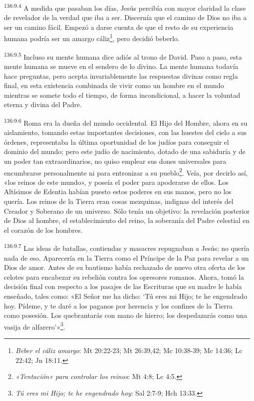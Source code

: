 \par
\textsuperscript{136:9.4} A medida que pasaban los días, Jesús percibía con mayor claridad la clase de revelador de la verdad que iba a ser. Discernía que el camino de Dios no iba a ser un camino fácil. Empezó a darse cuenta de que el resto de su experiencia humana podría ser un amargo cáliz\footnote{\textit{Beber el cáliz amargo}: Mt 20:22-23; Mt 26:39,42; Mc 10:38-39; Mc 14:36; Lc 22:42; Jn 18:11.}, pero decidió beberlo.

\par
\textsuperscript{136:9.5} Incluso su mente humana dice adiós al trono de David. Paso a paso, esta mente humana se mueve en el sendero de lo divino. La mente humana todavía hace preguntas, pero acepta invariablemente las respuestas divinas como regla final, en esta existencia combinada de vivir como un hombre en el mundo mientras se somete todo el tiempo, de forma incondicional, a hacer la voluntad eterna y divina del Padre.

\par
\textsuperscript{136:9.6} Roma era la dueña del mundo occidental. El Hijo del Hombre, ahora en su aislamiento, tomando estas importantes decisiones, con las huestes del cielo a sus órdenes, representaba la última oportunidad de los judíos para conseguir el dominio del mundo; pero este judío de nacimiento, dotado de una sabiduría y de un poder tan extraordinarios, no quiso emplear sus dones universales para encumbrarse personalmente ni para entronizar a su pueblo\footnote{\textit{«Tentación» para controlar los reinos}: Mt 4:8; Lc 4:5.}. Veía, por decirlo así, «los reinos de este mundo», y poseía el poder para apoderarse de ellos. Los Altísimos de Edentia habían puesto estos poderes en sus manos, pero no los quería. Los reinos de la Tierra eran cosas mezquinas, indignas del interés del Creador y Soberano de un universo. Sólo tenía un objetivo: la revelación posterior de Dios al hombre, el establecimiento del reino, la soberanía del Padre celestial en el corazón de los hombres.

\par
\textsuperscript{136:9.7} Las ideas de batallas, contiendas y masacres repugnaban a Jesús; no quería nada de eso. Aparecería en la Tierra como el Príncipe de la Paz para revelar a un Dios de amor. Antes de su bautismo había rechazado de nuevo otra oferta de los celotes para encabezar su rebelión contra los opresores romanos. Ahora, tomó la decisión final con respecto a los pasajes de las Escrituras que su madre le había enseñado, tales como: «El Señor me ha dicho: `Tú eres mi Hijo; te he engendrado hoy. Pídeme, y te daré a los paganos por herencia y los confines de la Tierra como posesión. Los quebrantarás con mano de hierro; los despedazarás como una vasija de alfarero'»\footnote{\textit{Tú eres mi Hijo; te he engendrado hoy}: Sal 2:7-9; Hch 13:33.}.

